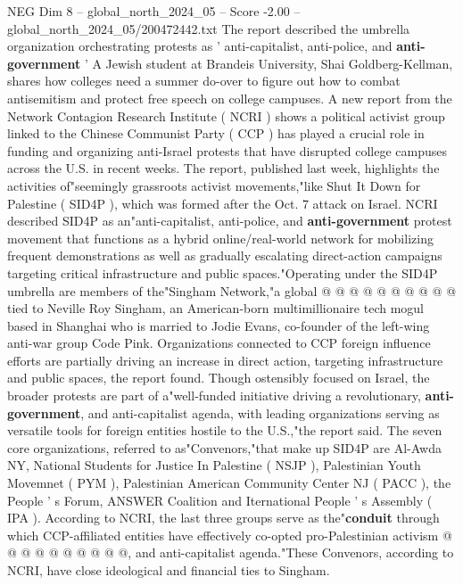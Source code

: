 \begin{textsample}{NEG Dim 8 – global\_north\_2024\_05 – Score -2.00 – global\_north\_2024\_05/200472442.txt}  \label{ex:f8_neg_269}
The report described the umbrella organization orchestrating protests as ' anti-capitalist, anti-police, and \textbf{anti-government} ' A Jewish student at Brandeis University, Shai Goldberg-Kellman, shares how colleges need a summer do-over to figure out how to combat antisemitism and protect free speech on college campuses.
A new report from the Network Contagion Research Institute ( NCRI ) shows a political activist group linked to the Chinese Communist Party ( CCP ) has played a crucial role in funding and organizing anti-Israel protests that have disrupted college campuses across the U.S. in recent weeks.
The report, published last week, highlights the activities of"seemingly grassroots activist movements,"like Shut It Down for Palestine ( SID4P ), which was formed after the Oct. 7 attack on Israel.
NCRI described SID4P as an"anti-capitalist, anti-police, and \textbf{anti-government} protest movement that functions as a hybrid online/real-world network for mobilizing frequent demonstrations as well as gradually escalating direct-action campaigns targeting critical infrastructure and public spaces."Operating under the SID4P umbrella are members of the"Singham Network,"a global @ @ @ @ @ @ @ @ @ @ tied to Neville Roy Singham, an American-born multimillionaire tech mogul based in Shanghai who is married to Jodie Evans, co-founder of the left-wing anti-war group Code Pink.
Organizations connected to CCP foreign influence efforts are partially driving an increase in direct action, targeting infrastructure and public spaces, the report found.
Though ostensibly focused on Israel, the broader protests are part of a"well-funded initiative driving a revolutionary, \textbf{anti-government}, and anti-capitalist agenda, with leading organizations serving as versatile tools for foreign entities hostile to the U.S.,"the report said.
The seven core organizations, referred to as"Convenors,"that make up SID4P are Al-Awda NY, National Students for Justice In Palestine ( NSJP ), Palestinian Youth Movemnet ( PYM ), Palestinian American Community Center NJ ( PACC ), the People ' s Forum, ANSWER Coalition and Iternational People ' s Assembly ( IPA ).
According to NCRI, the last three groups serve as the"\textbf{conduit} through which CCP-affiliated entities have effectively co-opted pro-Palestinian activism @ @ @ @ @ @ @ @ @ @, and anti-capitalist agenda."These Convenors, according to NCRI, have close ideological and financial ties to Singham.

\end{textsample}
